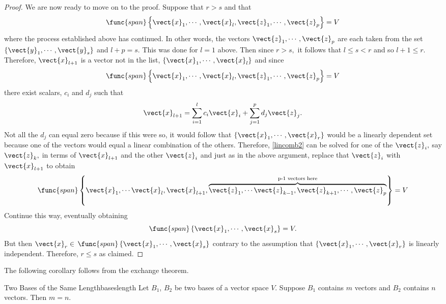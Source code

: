 \begin{proof}
We are now ready to move on to the proof. Suppose that $r>s$ and that 
\[
\func{span}\left\{ \vect{x}_{1},\cdots ,
\vect{x}_{l},\vect{z}_{1},\cdots ,\vect{z}_{p}\right\} =V
\]
 where the process established above has continued. In other words, the vectors $\vect{z}_{1},\cdots ,\vect{z}_{p}$ are each taken from the
set $\left\{ \vect{y}_{1},\cdots ,\vect{y}_{s}\right\} $ and $l+p=s.$
This was done for $l=1$ above. Then since $r>s,$ it follows that $
l\leq s<r$ and so $l+1\leq r.$ Therefore, $\vect{x}_{l+1}$ is a vector not
in the list, $\left\{ \vect{x}_{1},\cdots ,\vect{x}_{l}\right\} $ and
since 
\[
\func{span}\left\{ \vect{x}_{1},\cdots ,\vect{x}_{l},\vect{z}
_{1},\cdots ,\vect{z}_{p}\right\} =V
\]
 there exist scalars, $c_{i}$ and $
d_{j}$ such that 
\begin{equation}
\vect{x}_{l+1}=\sum_{i=1}^{l}c_{i}\vect{x}_{i}+\sum_{j=1}^{p}d_{j}
\vect{z}_{j}.  \label{lincomb2}
\end{equation}
Not all the $d_{j}$ can equal zero because if this were so, it would follow
that $\left\{ \vect{x}_{1},\cdots ,\vect{x}_{r}\right\} $ would be a
linearly dependent set because one of the vectors would equal a linear
combination of the others. Therefore, \ref{lincomb2} can be solved for one of the 
$\vect{z}_{i},$ say $\vect{z}_{k},$ in terms of $\vect{x}_{l+1}$ and
the other $\vect{z}_{i}$ and just as in the above argument, replace that $
\vect{z}_{i}$ with $\vect{x}_{l+1}$ to obtain 
\begin{equation*}
\func{span}\left\{ \vect{x}_{1},\cdots \vect{x}_{l},\vect{x}_{l+1},
\overset{\text{p-1 vectors here}}{\overbrace{\vect{z}_{1},\cdots \vect{z}
_{k-1},\vect{z}_{k+1},\cdots ,\vect{z}_{p}}}\right\} =V
\end{equation*}
Continue this way, eventually obtaining 
\begin{equation*}
\func{span}\left\{ \vect{x}_{1},\cdots ,\vect{x}_{s}\right\} =V.
\end{equation*}
But then $\vect{x}_{r}\in $ $\func{span}\left\{ \vect{x}_{1},\cdots ,
\vect{x}_{s}\right\} $ contrary to the assumption that $\left\{ \vect{x}
_{1},\cdots ,\vect{x}_{r}\right\} $ is linearly independent. Therefore, $
r\leq s$ as claimed.
\end{proof}

The following corollary follows from the exchange theorem.

\begin{corollary}{Two Bases of the Same Length}{baseslength}
Let $B_1$, $B_2$ be two bases of a vector space $V$. Suppose $B_1$ contains $m$ vectors and $B_2$ contains $n$ vectors. Then $m = n$.
\end{corollary}


